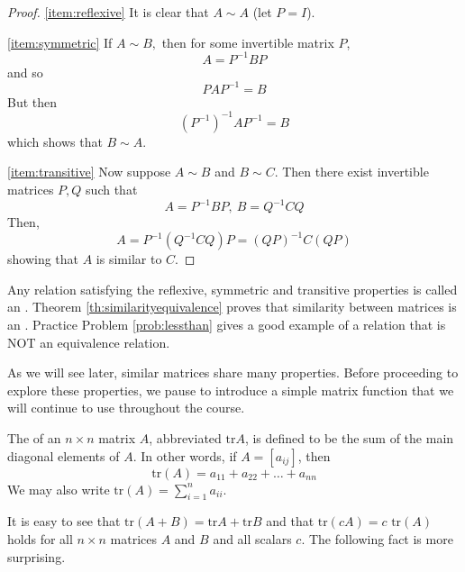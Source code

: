 \documentclass{ximera}
\begin{document}
\begin{proof}
\ref{item:reflexive} It is clear that $A\sim A$ (let $P=I$).

\ref{item:symmetric}
If $A\sim B,$ then for some invertible matrix $P$,
\begin{equation*}
A=P^{-1}BP
\end{equation*}
and so
\begin{equation*}
PAP^{-1}=B
\end{equation*}
But then
\begin{equation*}
\left( P^{-1}\right) ^{-1}AP^{-1}=B
\end{equation*}
which shows that $B\sim A$.

\ref{item:transitive}
Now suppose $A\sim B$ and $B\sim C$. Then there exist invertible matrices
$P,Q$ such that
\begin{equation*}
A=P^{-1}BP,\ B=Q^{-1}CQ
\end{equation*}
Then,
\begin{equation*}
A=P^{-1} \left( Q^{-1}CQ \right)P=\left( QP\right) ^{-1}C\left( QP\right)
\end{equation*}
showing that $A$ is similar to $C$.
\end{proof}

Any relation satisfying the reflexive, symmetric and transitive properties is called an  .  Theorem \ref{th:similarityequivalence} proves that similarity between matrices is an .  Practice Problem \ref{prob:lessthan} gives a good example of a relation that is NOT an equivalence relation.

As we will see later, similar matrices share many properties. 
 Before proceeding to explore these properties, we pause to introduce a simple matrix function that we will continue to use throughout the course.  %

\begin{definition}\label{def:trace}
The  of an $n \times n$ matrix $A$, abbreviated $\mbox{tr} A$, is defined to be the sum of the main diagonal elements of $A$.  In other words, if $ A = [a_{ij}]$, then $$\mbox{tr}(A) = a_{11} + a_{22} + \dots + a_{nn}$$  We may also write $\mbox{tr}(A) =\sum_{i=1}^n a_{ii}$.
\end{definition}

It is easy to see that $\mbox{tr}(A + B) = \mbox{tr} A + \mbox{tr} B$ and that $\mbox{tr}(cA) = c \mbox{ tr}(A)$ holds for all $n \times n$ matrices $A$ and $B$ and all scalars $c$. The following fact is more surprising.
\end{document}
